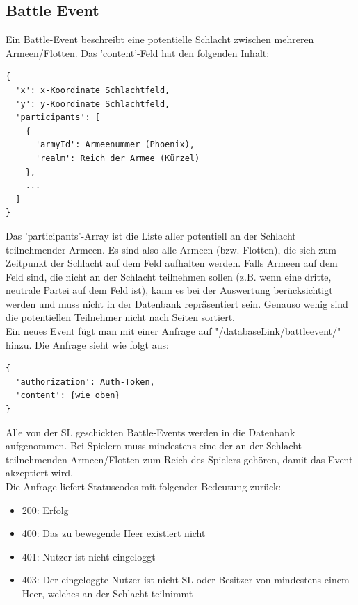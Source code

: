 \documentclass[11pt,a4paper,twocolumn]{article}
\begin{document}
\subsection{Battle Event}\label{ss:events_battle}
Ein Battle-Event beschreibt eine potentielle Schlacht zwischen mehreren Armeen/Flotten. Das 'content'-Feld hat den folgenden Inhalt:
\begin{lstlisting}
{
  'x': x-Koordinate Schlachtfeld,
  'y': y-Koordinate Schlachtfeld,
  'participants': [
    {
      'armyId': Armeenummer (Phoenix),
      'realm': Reich der Armee (Kürzel)
    },
    ...
  ]
}
\end{lstlisting}
Das 'participants'-Array ist die Liste aller potentiell an der Schlacht teilnehmender Armeen. Es sind also alle Armeen (bzw. Flotten), die sich zum Zeitpunkt der Schlacht auf dem Feld aufhalten werden. Falls Armeen auf dem Feld sind, die nicht an der Schlacht teilnehmen sollen (z.B. wenn eine dritte, neutrale Partei auf dem Feld ist), kann es bei der Auswertung berücksichtigt werden und muss nicht in der Datenbank repräsentiert sein. Genauso wenig sind die potentiellen Teilnehmer nicht nach Seiten sortiert.\\
Ein neues Event fügt man mit einer Anfrage auf "/databaseLink/battleevent/" hinzu.  Die Anfrage sieht wie folgt aus:
\begin{lstlisting}
{
  'authorization': Auth-Token,
  'content': {wie oben}
}
\end{lstlisting}
Alle von der SL geschickten Battle-Events werden in die Datenbank aufgenommen. Bei Spielern muss mindestens eine der an der Schlacht teilnehmenden Armeen/Flotten zum Reich des Spielers gehören, damit das Event akzeptiert wird.\\
Die Anfrage liefert Statuscodes mit folgender Bedeutung zurück:
\begin{itemize}
\item 200: Erfolg
\item 400: Das zu bewegende Heer existiert nicht
\item 401: Nutzer ist nicht eingeloggt
\item 403: Der eingeloggte Nutzer ist nicht SL oder Besitzer von mindestens einem Heer, welches an der Schlacht teilnimmt
\end{itemize}

\end{document}
